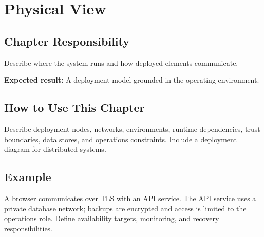 \chapter{Physical View}
\section{Chapter Responsibility}
\label{Section:PhysicalViewResponsibility}
Describe where the system runs and how deployed elements communicate.

\noindent\textbf{Expected result:} A deployment model grounded in the operating environment.

\section{How to Use This Chapter}
Describe deployment nodes, networks, environments, runtime dependencies, trust boundaries, data stores, and operations constraints. Include a deployment diagram for distributed systems.
\section{Example}
A browser communicates over TLS with an API service. The API service uses a private database network; backups are encrypted and access is limited to the operations role. Define availability targets, monitoring, and recovery responsibilities.
